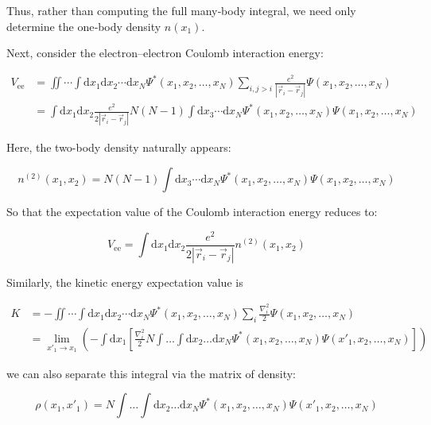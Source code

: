 Thus, rather than computing the full many‐body integral, we need only determine the one‐body density $n(x_1)$.

Next, consider the electron–electron Coulomb interaction energy:

\begin{equation}
\begin{aligned}
    V_\mathrm{ee}
    &= \iint\cdots\int \mathrm{d}x_1\mathrm{d}x_2\cdots\mathrm{d}x_N\Psi^*(x_1,x_2,\dots,x_N)\sum_{i,j>i}\frac{e^2}{|\vec{r}_i-\vec{r}_j|}\Psi(x_1,x_2,\dots,x_N) \\
    &= \int\mathrm{d}x_1\mathrm{d}x_2\frac{e^2}{2|\vec{r}_i-\vec{r}_j|}N(N-1)\int\mathrm{d}x_3\cdots\mathrm{d}x_N\Psi^*(x_1,x_2,\dots,x_N)\Psi(x_1,x_2,\dots,x_N)
\end{aligned}
\label{coulomb_interaction_energy}
\end{equation}

Here, the two-body density naturally appears:

\begin{equation}
n^{(2)}(x_1,x_2)=N(N-1)\int\mathrm{d}x_3\cdots\mathrm{d}x_N\Psi^*(x_1,x_2,\dots,x_N)\Psi(x_1,x_2,\dots,x_N)
\label{two-body_density}
\end{equation}

So that the expectation value of the Coulomb interaction energy reduces to:

\begin{equation}
V_\mathrm{ee}=\int\mathrm{d}x_1\mathrm{d}x_2\frac{e^2}{2|\vec{r}_i-\vec{r}_j|}n^{(2)}(x_1,x_2)
\label{observables_two-body_density}
\end{equation}

Similarly, the kinetic energy expectation value is

\begin{equation}
\begin{aligned}
    K&= -\iint\cdots\int \mathrm{d}x_1\mathrm{d}x_2\cdots\mathrm{d}x_N\Psi^*(x_1,x_2,\dots,x_N)\sum_{i}\frac{\nabla_i^2}{2}\Psi(x_1,x_2,\dots,x_N) \\
    &= \lim_{x'_1\to x_1}\left( -\int\mathrm{d}x_1\left[\frac{\nabla_i^2}{2}N\int\dots\int\mathrm{d}x_2\dots\mathrm{d}x_N\Psi^*(x_1,x_2,\dots,x_N)\Psi(x'_1,x_2,\dots,x_N) \right]\right)
\end{aligned}
\label{kinetic_energy}
\end{equation}

we can also separate this integral via the matrix of density:

\begin{equation}
\rho(x_1,x'_1)
=N\int\dots\int\mathrm{d}x_2\dots\mathrm{d}x_N\Psi^*(x_1,x_2,\dots,x_N)\Psi(x'_1,x_2,\dots,x_N) 
\label{density_matrix}
\end{equation}

